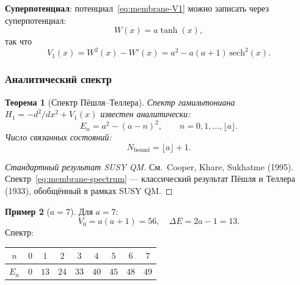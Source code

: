 \documentclass[11pt,a4paper]{article}
\newtheorem{theorem}{Теорема}[section]
\theoremstyle{definition}
\newtheorem{example}[theorem]{Пример}
\begin{document}
\medskip\noindent
\textbf{Суперпотенциал}: потенциал~\eqref{eq:membrane-V1} можно
записать через суперпотенциал:
\begin{equation}
    W(x) = a \tanh(x),
    \label{eq:membrane-W}
\end{equation}
так что
\begin{equation}
    V_1(x) = W^2(x) - W'(x) = a^2 - a(a+1) \, \mathrm{sech}^2(x).
    \label{eq:membrane-V1-from-W}
\end{equation}

\subsubsection{Аналитический спектр}

\begin{theorem}[Спектр Пёшля--Теллера]
\label{thm:membrane-spectrum}
Спектр гамильтониана $H_1 = -d^2/dx^2 + V_1(x)$ известен
аналитически:
\begin{equation}
    \boxed{
    E_n = a^2 - (a - n)^2, \qquad n = 0, 1, \ldots, \lfloor a \rfloor.
    }
    \label{eq:membrane-spectrum}
\end{equation}
Число связанных состояний:
\begin{equation}
    N_{\text{bound}} = \lfloor a \rfloor + 1.
    \label{eq:membrane-bound-states}
\end{equation}
\end{theorem}

\begin{proof}[Стандартный результат SUSY QM]
См.~Cooper, Khare, Sukhatme (1995). Спектр~\eqref{eq:membrane-spectrum}
--- классический результат Пёшля и Теллера (1933), обобщённый
в рамках SUSY QM.
\end{proof}

\begin{example}[$a = 7$]
Для $a = 7$:
\begin{equation}
    V_0 = a(a+1) = 56, \quad
    \Delta E = 2a - 1 = 13.
\end{equation}
Спектр:
\begin{center}
\begin{tabular}{c|cccccccc}
\toprule
$n$ & $0$ & $1$ & $2$ & $3$ & $4$ & $5$ & $6$ & $7$ \\
\midrule
$E_n$ & $0$ & $13$ & $24$ & $33$ & $40$ & $45$ & $48$ & $49$ \\
\bottomrule
\end{tabular}
\end{center}
\end{example}
\end{document}

